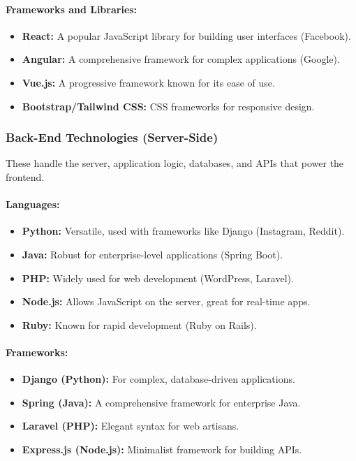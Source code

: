 \documentclass[a4paper,12pt]{article}
\begin{document}
\paragraph{Frameworks and Libraries:}
\begin{itemize}
    \item \textbf{React:} A popular JavaScript library for building user interfaces (Facebook).
    \item \textbf{Angular:} A comprehensive framework for complex applications (Google).
    \item \textbf{Vue.js:} A progressive framework known for its ease of use.
    \item \textbf{Bootstrap/Tailwind CSS:} CSS frameworks for responsive design.
\end{itemize}

\subsubsection{Back-End Technologies (Server-Side)}
These handle the server, application logic, databases, and APIs that power the frontend.

\paragraph{Languages:}
\begin{itemize}
    \item \textbf{Python:} Versatile, used with frameworks like Django (Instagram, Reddit).
    \item \textbf{Java:} Robust for enterprise-level applications (Spring Boot).
    \item \textbf{PHP:} Widely used for web development (WordPress, Laravel).
    \item \textbf{Node.js:} Allows JavaScript on the server, great for real-time apps.
    \item \textbf{Ruby:} Known for rapid development (Ruby on Rails).
\end{itemize}

\paragraph{Frameworks:}
\begin{itemize}
    \item \textbf{Django (Python):} For complex, database-driven applications.
    \item \textbf{Spring (Java):} A comprehensive framework for enterprise Java.
    \item \textbf{Laravel (PHP):} Elegant syntax for web artisans.
    \item \textbf{Express.js (Node.js):} Minimalist framework for building APIs.
\end{itemize}
\end{document}
